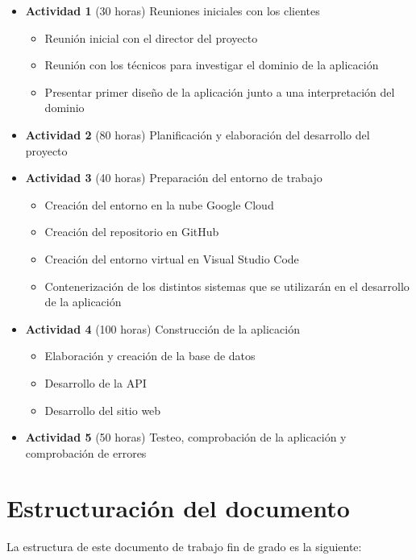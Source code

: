 \begin{itemize}
    \item \textbf{Actividad 1} (30 horas) Reuniones iniciales con los clientes
          \begin{itemize}
              \item Reunión inicial con el director del proyecto
              \item Reunión con los técnicos para investigar el dominio de la aplicación
              \item Presentar primer diseño de la aplicación junto a una interpretación del dominio
          \end{itemize}
    \item \textbf{Actividad 2} (80 horas) Planificación y elaboración del desarrollo del proyecto
    \item \textbf{Actividad 3} (40 horas) Preparación del entorno de trabajo
          \begin{itemize}
              \item Creación del entorno en la nube Google Cloud
              \item Creación del repositorio en GitHub
              \item Creación del entorno virtual en Visual Studio Code
              \item Contenerización de los distintos sistemas que se utilizarán en el desarrollo de la aplicación
          \end{itemize}
    \item \textbf{Actividad 4} (100 horas) Construcción de la aplicación
          \begin{itemize}
              \item Elaboración y creación de la base de datos
              \item Desarrollo de la API
              \item Desarrollo del sitio web
          \end{itemize}
    \item \textbf{Actividad 5} (50 horas) Testeo, comprobación de la aplicación y comprobación de errores
\end{itemize}


\section{Estructuración del documento}

La estructura de este documento de trabajo fin de grado es la siguiente:

